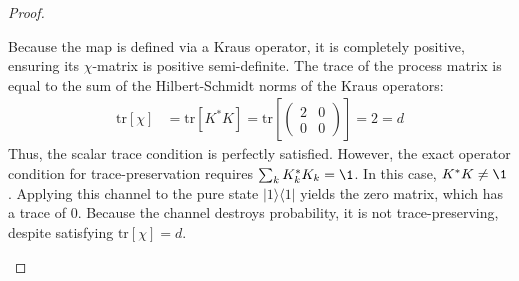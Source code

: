 \begin{proof}
\begin{enumerate}
Because the map is defined via a Kraus operator, it is completely positive, ensuring its $\chi$-matrix is positive semi-definite. The trace of the process matrix is equal to the sum of the Hilbert-Schmidt norms of the Kraus operators:
\begin{align*}
    \text{tr}[\chi] &= \text{tr}[K^* K] = \text{tr}\left[ \begin{pmatrix} 2 & 0 \\ 0 & 0 \end{pmatrix} \right] = 2 = d
\end{align*}
Thus, the scalar trace condition is perfectly satisfied. However, the exact operator condition for trace-preservation requires $\sum_k K_k^* K_k = \1$. In this case, $K^* K \neq \1$. Applying this channel to the pure state $|1\rangle\langle 1|$ yields the zero matrix, which has a trace of 0. Because the channel destroys probability, it is not trace-preserving, despite satisfying $\text{tr}[\chi] = d$.

\end{enumerate}
\end{proof}


